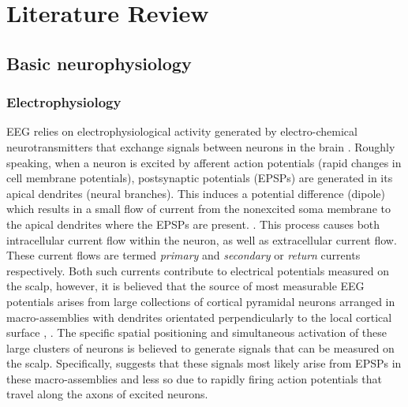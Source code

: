\chapter{Literature Review}
\label{chapter:lit-review}

\graphicspath{ {report/C2 Literature Review/assets/} } 

\section{Basic neurophysiology}

\subsection{Electrophysiology}
EEG relies on electrophysiological activity generated by electro-chemical neurotransmitters that exchange signals between neurons in the brain \cite{bci-survey-nicolas-alonso}. Roughly speaking, when a neuron is excited by afferent action potentials (rapid changes in cell membrane potentials), postsynaptic potentials (EPSPs) are generated in its apical dendrites \cite{baillet-em-brain-mapping} (neural branches). This induces a potential difference (dipole) which results in a small flow of current from the nonexcited soma membrane to the apical dendrites where the EPSPs are present. \cite{baillet-em-brain-mapping}. This process causes both intracellular current flow within the neuron, as well as extracellular current flow. These current flows are termed \textit{primary} and \textit{secondary} or \textit{return} currents respectively. Both such currents contribute to electrical potentials measured on the scalp, however, it is believed that the source of most measurable EEG potentials arises from large collections of cortical pyramidal neurons arranged in macro-assemblies with dendrites orientated perpendicularly to the local cortical surface \cite{baillet-em-brain-mapping}, \cite{teplan-eeg-measurement}. The specific spatial positioning and simultaneous activation of these large clusters of neurons is believed to generate signals that can be measured on the scalp. Specifically, \cite{baillet-em-brain-mapping} suggests that these signals most likely arise from EPSPs in these macro-assemblies and less so due to rapidly firing action potentials that travel along the axons of excited neurons.

